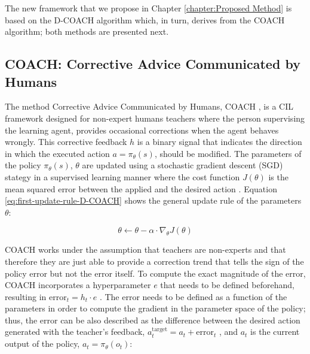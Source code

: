 The new framework that we propose in Chapter \ref{chapter:Proposed Method} is based on the D-COACH algorithm which, in turn, derives from the COACH algorithm; both methods are presented next.









\subsection{COACH: Corrective Advice Communicated by Humans}
\label{subsection:COACH}

The method Corrective Advice Communicated by Humans, COACH \cite{COACH-Celemin-Ruiz-del-Solar:2015}, is a CIL framework designed for non-expert humans teachers where the person supervising the learning agent, provides occasional corrections when the agent behaves wrongly. This corrective feedback $h$ is a binary signal that indicates the direction in which the executed action $a = \pi_\theta(s)$, should be modified.
The parameters of the policy $\pi_\theta(s)$, $\theta$ are updated using a stochastic gradient descent (SGD) stategy in a supervised learning manner where the cost function $J(\theta)$ is the mean squared error between the applied and the desired action \cite{Gaussian-COACH-wout:2019}. Equation \eqref{eq:first-update-rule-D-COACH} shows the general update rule of the parameters $\theta$:


\begin{equation}
\theta \leftarrow \theta - \alpha \cdot \nabla_\theta J(\theta)
\label{eq:first-update-rule-D-COACH}
\end{equation}

COACH works under the assumption that teachers are non-experts and that therefore they are just able to provide a correction trend that tells the sign of the policy error but not the error itself. To compute the exact magnitude of the error, COACH incorporates a hyperparameter $e$ that needs to be defined beforehand, resulting in $\text{error}_t = h_t \cdot e$  \cite{COACH-Celemin-Ruiz-del-Solar:2015}. The error needs to be defined as a function of the parameters in order to compute the gradient in the parameter space of the policy; thus, the error can be also described as the difference between the desired action generated with the teacher's feedback, $a^\text{target}_t = a_t + \text{error}_t$ , and $a_t$ is the current output of the policy, $a_t = \pi_\theta(o_t)$:


